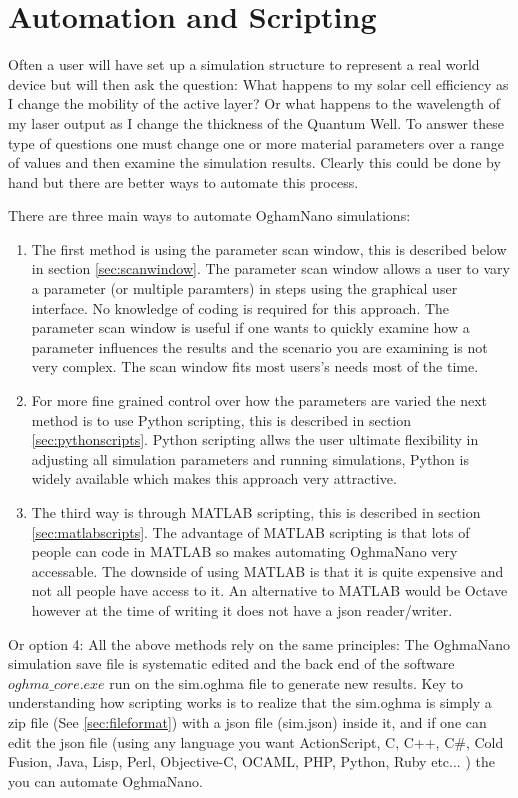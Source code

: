 \newpage
\chapter{Automation and Scripting}
Often a user will have set up a simulation structure to represent a real world device but will then ask the question: What happens to my solar cell efficiency as I change the mobility of the active layer? Or what happens to the wavelength of my laser output as I change the thickness of the Quantum Well. To answer these type of questions one must change one or more material parameters over a range of values and then examine the simulation results.  Clearly this could be done by hand but there are better ways to automate this process.

There are three main ways to automate OghamNano simulations:
\begin{enumerate}
  \item The first method is using the parameter scan window, this is described below in section \ref{sec:scanwindow}.  The parameter scan window allows a user to vary a parameter (or multiple paramters) in steps using the graphical user interface. No knowledge of coding is required for this approach.  The parameter scan window is useful if one wants to quickly examine how a parameter influences the results and the scenario you are examining is not very complex. The scan window fits most users's needs most of the time.
  \item For more fine grained control over how the parameters are varied the next method is to use Python scripting, this is described in section \ref{sec:pythonscripts}.  Python scripting allws the user ultimate flexibility in adjusting all simulation parameters and running simulations, Python is widely available which makes this approach very attractive. 
  \item The third way is through MATLAB scripting, this is described in section \ref{sec:matlabscripts}. The advantage of MATLAB scripting is that lots of people can code in MATLAB so makes automating OghmaNano very accessable. The downside of using MATLAB is that it is quite expensive and not all people have access to it. An alternative to MATLAB would be Octave however at the time of writing it does not have a json reader/writer.
\end{enumerate}

Or option 4: All the above methods rely on the same principles: The OghmaNano simulation save file is systematic edited and the back end of the software $oghma\_core.exe$ run on the sim.oghma file to generate new results. Key to understanding how scripting works is to realize that the sim.oghma is simply a zip file (See \ref{sec:fileformat}) with a json file (sim.json) inside it, and if one can edit the json file (using any language you want ActionScript, C, C++, C\#, Cold Fusion, Java, Lisp, Perl, Objective-C, OCAML, PHP, Python, Ruby etc... ) the you can automate OghmaNano.
\vfill

\pagebreak





